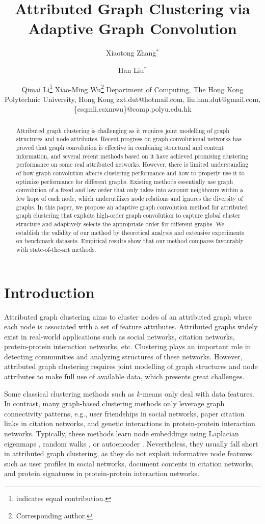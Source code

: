 \documentclass{article}
\title{Attributed Graph Clustering via Adaptive Graph Convolution}
\author{
Xiaotong Zhang$^\ast$
\and
Han Liu$^\ast$\and
Qimai Li\footnote{indicates equal contribution.}\And
Xiao-Ming Wu\thanks{Corresponding author.}
\affiliations
Department of Computing, The Hong Kong Polytechnic University, Hong Kong
\emails
zxt.dut@hotmail.com,
liu.han.dut@gmail.com,
\{csqmli,csxmwu\}@comp.polyu.edu.hk
}
\begin{document}
\maketitle

\begin{abstract}
Attributed graph clustering is challenging as it requires joint modelling of graph structures and node attributes. Recent progress on graph convolutional networks has proved that graph convolution is effective in combining structural and content information, and several recent methods based on it have achieved promising clustering performance on some real attributed networks. However, there is limited understanding of how graph convolution affects clustering performance and how to properly use it to optimize performance for different graphs. Existing methods essentially use graph convolution of a fixed and low order that only takes into account neighbours within a few hops of each node, which underutilizes node relations and ignores the diversity of graphs. In this paper, we propose an adaptive graph convolution method for attributed graph clustering that exploits high-order graph convolution to capture global cluster structure and adaptively selects the appropriate order for different graphs. We establish the validity of our method by theoretical analysis and extensive experiments on benchmark datasets. Empirical results show that our method compares favourably with state-of-the-art methods.
\end{abstract}


\section{Introduction}

Attributed graph clustering \cite{tkde/CaiZC18} aims to cluster nodes of an attributed graph where each node is associated with a set of feature attributes. Attributed graphs widely exist in real-world applications such as social networks, citation networks, protein-protein interaction networks, etc. Clustering plays an important role in detecting communities and analyzing structures of these networks. However, attributed graph clustering requires  joint modelling of graph structures and node attributes to make full use of available data, which presents great challenges.



Some classical clustering methods such as $k$-means only deal with data features. In contrast, many graph-based clustering methods \cite{schaeffer2007graph} only leverage graph connectivity patterns, e.g., user friendships in social networks, paper citation links in citation networks, and genetic interactions in protein-protein interaction networks. Typically, these methods learn node embeddings using Laplacian eigenmaps \cite{newman2006finding}, random walks \cite{perozzi2014deepwalk}, or autoencoder \cite{wang2016structural}. Nevertheless, they usually fall short in attributed graph clustering, as they do not exploit informative node features such as user profiles in social networks, document contents in citation networks, and protein signatures in protein-protein interaction networks.
\end{document}
